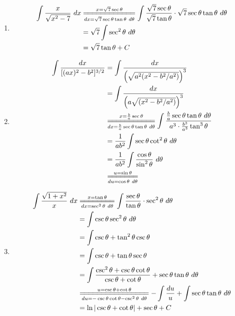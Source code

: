 \documentclass{article}
\begin{document}
\begin{enumerate}[label={\bf{}\arabic*}.]
\color{red}\item[\refstepcounter{enumi}\fbox{\number\value{enumi}.}]\color{black}%
	\begin{align*}
	\int\frac{x}{\sqrt{x^2-7}}\ dx&\overset{x=\sqrt{7}\sec\theta}{\underset{dx=\sqrt{7}\sec\theta\tan\theta\ d\theta}{=\joinrel=\joinrel=\joinrel=\joinrel=\joinrel=\joinrel=\joinrel=\joinrel=\joinrel=\joinrel=\joinrel=}}\int\frac{\sqrt{7}\sec\theta}{\sqrt{7}\tan\theta}\cdot\sqrt{7}\sec\theta\tan\theta\ d\theta\\
	&=\sqrt{7}\int\sec^2\theta\ d\theta\\
	&=\sqrt{7}\tan\theta+C
	\end{align*}

\item%
	\begin{align*}
	\int\frac{dx}{[(ax)^2-b^2]^{3/2}}&=\int\frac{dx}{\left(\sqrt{a^2(x^2-b^2/a^2)}\right)^3}\\
	&=\int\frac{dx}{\left(a\sqrt{(x^2-b^2/a^2)}\right)^3}\\
	&\overset{x=\frac{b}{a}\sec\theta}{\underset{dx=\frac{b}{a}\sec\theta\tan\theta\ d\theta}{=\joinrel=\joinrel=\joinrel=\joinrel=\joinrel=\joinrel=\joinrel=\joinrel=\joinrel=\joinrel=}}\int\frac{\frac{b}{a}\sec\theta\tan\theta\ d\theta}{a^3\cdot\frac{b^3}{a^3}\tan^3\theta}\\
	&=\frac{1}{ab^2}\int\sec\theta\cot^2\theta\ d\theta\\
	&=\frac{1}{ab^2}\int\frac{\cos\theta}{\sin^2\theta}\ d\theta\\
	&\overset{u=\sin\theta}{\underset{du=\cos\theta\ d\theta}{=\joinrel=\joinrel=\joinrel=\joinrel=\joinrel=\joinrel=}}
	\end{align*}

\item%
	\begin{align*}
	\int\frac{\sqrt{1+x^2}}{x}\ dx&\overset{x=\tan\theta}{\underset{dx=\sec^2\theta\ d\theta}{=\joinrel=\joinrel=\joinrel=\joinrel=\joinrel=\joinrel=\joinrel=}}\int\frac{\sec\theta}{\tan\theta}\cdot\sec^2\theta\ d\theta\\
	&=\int\csc\theta\sec^2\theta\ d\theta\\
	&=\int\csc\theta+\tan^2\theta\csc\theta\\
	&=\int\csc\theta+\tan\theta\sec\theta\\
	&=\int\frac{\csc^2\theta+\csc\theta\cot\theta}{\csc\theta+\cot\theta}+\sec\theta\tan\theta\ d\theta\\
	&\overset{u=\csc\theta+\cot\theta}{\underset{du=-\csc\theta\cot\theta-\csc^2\theta\ d\theta}{=\joinrel=\joinrel=\joinrel=\joinrel=\joinrel=\joinrel=\joinrel=\joinrel=\joinrel=\joinrel=\joinrel=\joinrel=\joinrel=\joinrel=\joinrel=}}-\int\frac{du}{u}+\int\sec\theta\tan\theta\ d\theta\\
	&=\ln|\csc\theta+\cot\theta|+\sec\theta+C
	\end{align*}


\end{enumerate}
\end{document}
